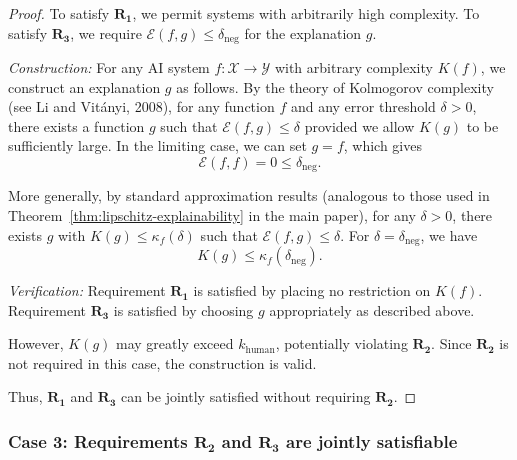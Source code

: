 \documentclass[11pt,letter,leqno]{article}
\begin{document}
\begin{proof}
To satisfy $\mathbf{R_1}$, we permit systems with arbitrarily high complexity. To 
satisfy $\mathbf{R_3}$, we require $\mathcal{E}(f,g) \leq \delta_{\text{neg}}$ for 
the explanation $g$.

\textit{Construction:} For any AI system $f: \mathcal{X} \to \mathcal{Y}$ with 
arbitrary complexity $K(f)$, we construct an explanation $g$ as follows. By the 
theory of Kolmogorov complexity (see Li and Vit\'anyi, 2008), for any function 
$f$ and any error threshold $\delta > 0$, there exists a function $g$ such that 
$\mathcal{E}(f,g) \leq \delta$ provided we allow $K(g)$ to be sufficiently large. 
In the limiting case, we can set $g = f$, which gives
\[
\mathcal{E}(f,f) = 0 \leq \delta_{\text{neg}}.
\]

More generally, by standard approximation results (analogous to those used in 
Theorem~\ref{thm:lipschitz-explainability} in the main paper), for any $\delta > 0$, 
there exists $g$ with $K(g) \leq \kappa_f(\delta)$ such that $\mathcal{E}(f,g) 
\leq \delta$. For $\delta = \delta_{\text{neg}}$, we have
\[
K(g) \leq \kappa_f(\delta_{\text{neg}}).
\]

\textit{Verification:} Requirement $\mathbf{R_1}$ is satisfied by placing no 
restriction on $K(f)$. Requirement $\mathbf{R_3}$ is satisfied by choosing $g$ 
appropriately as described above.

However, $K(g)$ may greatly exceed $k_{\text{human}}$, potentially violating 
$\mathbf{R_2}$. Since $\mathbf{R_2}$ is not required in this case, the construction 
is valid.

Thus, $\mathbf{R_1}$ and $\mathbf{R_3}$ can be jointly satisfied without requiring 
$\mathbf{R_2}$.
\end{proof}

\subsubsection*{Case 3: Requirements $\mathbf{R_2}$ and $\mathbf{R_3}$ are jointly satisfiable}
\end{document}
